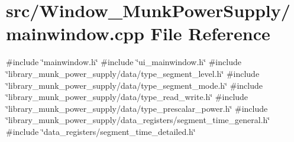 \section{src/\+Window\+\_\+\+Munk\+Power\+Supply/mainwindow.cpp File Reference}
\label{_window___munk_power_supply_2mainwindow_8cpp}
{\ttfamily \#include \char`\"{}mainwindow.\+h\char`\"{}}\newline
{\ttfamily \#include \char`\"{}ui\+\_\+mainwindow.\+h\char`\"{}}\newline
{\ttfamily \#include \char`\"{}library\+\_\+munk\+\_\+power\+\_\+supply/data/type\+\_\+segment\+\_\+level.\+h\char`\"{}}\newline
{\ttfamily \#include \char`\"{}library\+\_\+munk\+\_\+power\+\_\+supply/data/type\+\_\+segment\+\_\+mode.\+h\char`\"{}}\newline
{\ttfamily \#include \char`\"{}library\+\_\+munk\+\_\+power\+\_\+supply/data/type\+\_\+read\+\_\+write.\+h\char`\"{}}\newline
{\ttfamily \#include \char`\"{}library\+\_\+munk\+\_\+power\+\_\+supply/data/type\+\_\+prescalar\+\_\+power.\+h\char`\"{}}\newline
{\ttfamily \#include \char`\"{}library\+\_\+munk\+\_\+power\+\_\+supply/data\+\_\+registers/segment\+\_\+time\+\_\+general.\+h\char`\"{}}\newline
{\ttfamily \#include \char`\"{}data\+\_\+registers/segment\+\_\+time\+\_\+detailed.\+h\char`\"{}}\newline
